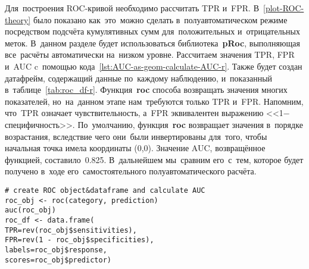 \documentclass[]{scrreprt}
\begin{document}
Для~построения ROC-кривой необходимо рассчитать TPR и~FPR. В~\ref{plot-ROC-theory} было показано как~это~можно сделать в~полуавтоматическом режиме посредством подсчёта кумулятивных сумм для~положительных и~отрицательных меток. В~данном разделе будет использоваться библиотека~\textbf{pRoc}, выполняющая все~расчёты автоматически на~низком уровне. Рассчитаем значения TPR, FPR и~AUC c~помощью кода~\ref{lst:AUC-as-geom-calculate-AUC-r}. Также будет создан датафрейм, содержащий данные по~каждому наблюдению, и~показанный в~таблице~\ref{tab:roc_df-r}. Функция~\textbf{roc} способа возвращать значения многих показателей, но~на~данном этапе нам~требуются только TPR и~FPR. Напомним, что~TPR означает чувствительность, а~FPR эквивалентен выражению <<1$-$ специфичность>>. По~умолчанию, функция~\textbf{roc} возвращает значения в~порядке возрастания, вследствие чего они~были инвертированы для~того, чтобы начальная точка имела координаты (0,0). Значение AUC, возвращённое функцией, составило~0.825. В~дальнейшем мы~сравним его~с~тем, которое будет получено в~ходе его~самостоятельного полуавтоматического расчёта.
%
\begin{lstlisting}[float, caption = Расчёт AUC с~помошью библиотеки pRoc, firstnumber=1, label= lst:AUC-as-geom-calculate-AUC-r]
# create ROC object&dataframe and calculate AUC
roc_obj <- roc(category, prediction)
auc(roc_obj)
roc_df <- data.frame(
TPR=rev(roc_obj$sensitivities), 
FPR=rev(1 - roc_obj$specificities), 
labels=roc_obj$response, 
scores=roc_obj$predictor)
\end{lstlisting}
%
\end{document}
